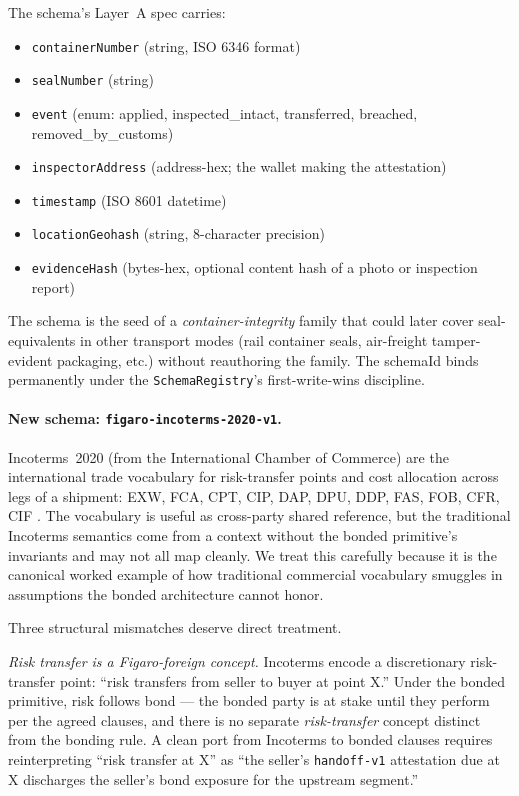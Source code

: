 \documentclass[11pt,a4paper]{article}
\theoremstyle{definition}
\theoremstyle{remark}
\begin{document}
The schema's Layer~A spec carries:

\begin{itemize}
  \item \texttt{containerNumber} (string, ISO 6346 format)
  \item \texttt{sealNumber} (string)
  \item \texttt{event} (enum: applied, inspected\_intact,
    transferred, breached, removed\_by\_customs)
  \item \texttt{inspectorAddress} (address-hex; the wallet
    making the attestation)
  \item \texttt{timestamp} (ISO 8601 datetime)
  \item \texttt{locationGeohash} (string, 8-character precision)
  \item \texttt{evidenceHash} (bytes-hex, optional content hash
    of a photo or inspection report)
\end{itemize}

The schema is the seed of a \emph{container-integrity} family
that could later cover seal-equivalents in other transport modes
(rail container seals, air-freight tamper-evident packaging, etc.)
without reauthoring the family. The schemaId binds permanently
under the \texttt{SchemaRegistry}'s first-write-wins discipline.

\paragraph{New schema: \texttt{figaro-incoterms-2020-v1}.}
Incoterms~2020 (from the International Chamber of Commerce) are
the international trade vocabulary for risk-transfer points and
cost allocation across legs of a shipment: EXW, FCA, CPT, CIP,
DAP, DPU, DDP, FAS, FOB, CFR, CIF
\citep{icc_incoterms_2020, ramberg2010icc}. The vocabulary is
useful as cross-party shared reference, but the traditional
Incoterms semantics come from a context without the bonded
primitive's invariants and may not all map cleanly. We treat
this carefully because it is the canonical worked example of
how traditional commercial vocabulary smuggles in assumptions
the bonded architecture cannot honor.

Three structural mismatches deserve direct treatment.

\emph{Risk transfer is a Figaro-foreign concept.} Incoterms
encode a discretionary risk-transfer point: ``risk transfers from
seller to buyer at point X.'' Under the bonded primitive, risk
follows bond --- the bonded party is at stake until they perform
per the agreed clauses, and there is no separate
\emph{risk-transfer} concept distinct from the bonding rule. A
clean port from Incoterms to bonded clauses requires reinterpreting
``risk transfer at X'' as ``the seller's
\texttt{handoff-v1} attestation due at X discharges the seller's
bond exposure for the upstream segment.''
\end{document}
